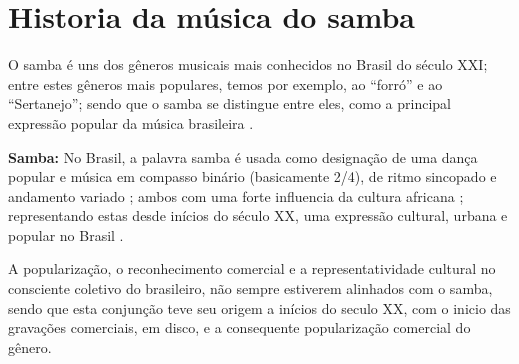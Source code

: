 
\chapter{Historia da música do samba}

O samba é uns dos gêneros musicais mais conhecidos no Brasil do século XXI;
entre estes gêneros mais populares, temos por exemplo, ao ``forró'' e ao ``Sertanejo'';
sendo que o samba se distingue entre eles, 
como a principal expressão popular da música brasileira \cite[pp. 47]{diniz2008almanaque}.\\


\begin{remarcar}
\textbf{Samba:}
\label{ref:samba} 
No Brasil, a palavra samba  é usada como designação de uma dança popular  e música  em compasso binário (basicamente 2/4), 
de ritmo sincopado e andamento variado \cite[pp. 290]{dourado2004dicionario} \cite[pp. 684]{marcondes1977enciclopediav2};
ambos com uma forte influencia da cultura africana \cite[pp. 290]{dourado2004dicionario};
representando estas desde inícios do século XX, 
uma expressão cultural, urbana e popular no Brasil \cite[pp. 684]{marcondes1977enciclopediav2} \cite[pp. 290]{dourado2004dicionario}.
\end{remarcar}

A popularização, o reconhecimento comercial e a representatividade cultural no consciente coletivo do brasileiro,
não sempre estiverem alinhados com o samba, 
sendo que esta conjunção teve seu origem a inícios do seculo XX, 
com o inicio das gravações comerciais, em disco, e a consequente popularização comercial do gênero.

